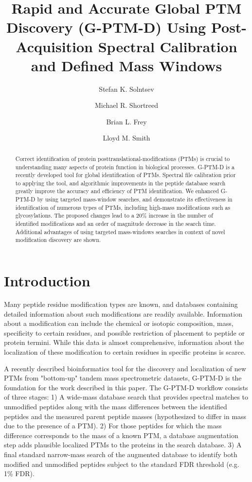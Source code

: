 \documentclass[journal=jprobs,manuscript=article]{achemso}
\author{Stefan K. Solntsev}
\author{Michael R. Shortreed}
\author{Brian L. Frey}
\author{Lloyd M. Smith}
\affiliation[UwMadison]
{University of Wisconsin-Madison}
\title[Rapid and Accurate Global PTM Discovery (G-PTM-D) Using Post-Acquisition Spectral Calibration and Defined Mass Windows]
  {Rapid and Accurate Global PTM Discovery (G-PTM-D) Using Post-Acquisition Spectral Calibration and Defined Mass Windows}
\begin{document}
\begin{abstract}

Correct identification of protein posttranslational-modifications (PTMs) is crucial to understanding many aspects of protein function in biological processes.
G-PTM-D\cite{Li_2016} is a recently developed tool for global identification of PTMs.
Spectral file calibration prior to applying the tool, and algorithmic improvements in the peptide database search greatly improve the accuracy and efficiency of PTM identification.
We enhanced G-PTM-D by using targeted mass-window searches, and demonstrate its effectiveness in identification of numerous types of PTMs, including high-mass modifications such as glycosylations.
The proposed changes lead to a 20\% increase in the number of identified modifications and an order of magnitude decrease in the search time.
Additional advantages of using targeted mass-windows searches in context of novel modification discovery are shown.
\end{abstract}

\section{Introduction}

Many peptide residue modification types are known, and databases containing detailed information about such modifications are readily available.
Information about a modification can include the chemical or isotopic composition, mass, specificity to certain residues, and possible restriction of placement to peptide or protein termini.
While this data is almost comprehensive, information about the localization of these modification to certain residues in specific proteins is scarce.

A recently described bioinformatics tool for the discovery and localization of new PTMs from "bottom-up" tandem mass spectrometric datasets, G-PTM-D\cite{Li_2016} is the foundation for the work described in this paper.
The G-PTM-D workflow consists of three stages: 1) A wide-mass database search\cite{Chick_2015,Na_2011} that provides spectral matches to unmodified peptides along with the mass differences between the identified peptides and the measured parent peptide masses (hypothesized to differ in mass due to the presence of a PTM).
2) For those peptides for which the mass difference corresponds to the mass of a known PTM, a database augmentation step adds plausible localized PTMs to the proteins in the search database.
3) A final standard narrow-mass search of the augmented database to identify both modified and unmodified peptides subject to the standard FDR threshold (e.g. 1\% FDR).
\end{document}
